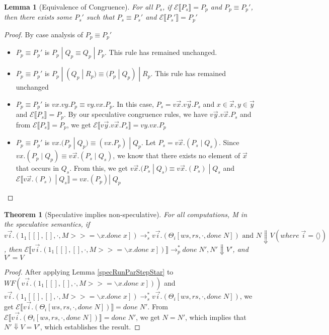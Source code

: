 \documentclass[9pt]{article}
\newtheorem{theorem}{Theorem}
\newtheorem{lemma}{Lemma}
\newcommand\specStep{\rightarrow_{s}}
\newcommand\parStep{\rightarrow_{p}}
\newcommand{\erase}[1]{\mathcal{E}\llbracket #1 \rrbracket}
\begin{document}
\begin{lemma}[Equivalence of Congruence]
\label{congruence}
For all $P_s$, if $\erase{P_s} = P_p$ and $P_p \equiv P_p'$, then there exists some $P_s'$ such that $P_s \equiv P_s'$ and $\erase{P_s'} = P_p'$
\end{lemma}

\begin{proof}
By case analysis of $P_p \equiv P_p'$
\begin{itemize}
\item $P_p \equiv P_p'$ is $P_p \; | \; Q_p \equiv Q_p \; | \; P_p$.  This rule has remained unchanged.  

\item $P_p \equiv P_p'$ is $P_p \; | \; (Q_p \; | \; R_p) \equiv (P_p \; | \; Q_p) \; | \; R_p$.  This rule has remained unchanged

\item $P_p \equiv P_p'$ is $vx.vy.P_p \equiv vy.vx.P_p$.  In this case, $P_s = v\vec{x}.v\vec{y}.P_s$ and $x \in \vec{x}, y \in \vec{y}$ and $\erase{P_s} = P_p$.  By our speculative congruence rules, we have $v\vec{y}.v\vec{x}.P_s$ and from $\erase{P_s} = P_p$, we get $\erase{v\vec{y}.v\vec{x}.P_s} = vy.vx.P_p$ 

\item $P_p \equiv P_p'$ is $vx.(P_p \; | \; Q_p) \equiv (vx.P_p) \; | \; Q_p$.  Let $P_s = v\vec{x}.(P_s \; | \; Q_s)$.  Since $vx.(P_p \; | \; Q_p) \equiv v\vec{x}.(P_s \; | \; Q_s)$, we know that there exists no element of $\vec{x}$ that occurs in $Q_s$.  From this, we get $v\vec{x}.(P_s \; | \; Q_s) \equiv v\vec{x}.(P_s) \; | \; Q_s$ and $\erase{v\vec{x}.(P_s) \; | \; Q_s} = vx.(P_p) | \; Q_p$
\end{itemize}
\end{proof}

\begin{theorem}[Speculative implies non-speculative]
For all computations, M in the speculative semantics, if $v\vec{i}.(1_1[[], [], \cdot, M >>= \backslash x. done \; x]) \specStep^* v\vec{i}.(\Theta_i[ws, rs, \cdot, done \; N] )\text{ and } N \Downarrow V (where \;\vec{i} = \langle\rangle)$, then $\erase{v\vec{i}.(1_1[[], [], \cdot, M >>= \backslash x. done \; x])} \parStep^* done \; N', N' \Downarrow V'$, and $V' = V$

\end{theorem}

\begin{proof}
After applying Lemma \ref{specRunParStepStar} to $WF(v\vec{i}.(1_1[[], [], \cdot, M >>= \backslash x. done \; x]))$ and $v\vec{i}.(1_1[[], [], \cdot, M >>= \backslash x. done \; x]) \specStep^* v\vec{i}.(\Theta_i[ws, rs, \cdot, done \; N])$, we get $\erase{v\vec{i}.(\Theta_i[ws, rs, \cdot, done \; N])} = done \; N'$.  From $\erase{v\vec{i}.(\Theta_i[ws, rs, \cdot, done \; N])} = done \; N'$, we get $N = N'$, which implies that $N' \Downarrow V = V'$, which establishes the result.
\end{proof}
\end{document}
